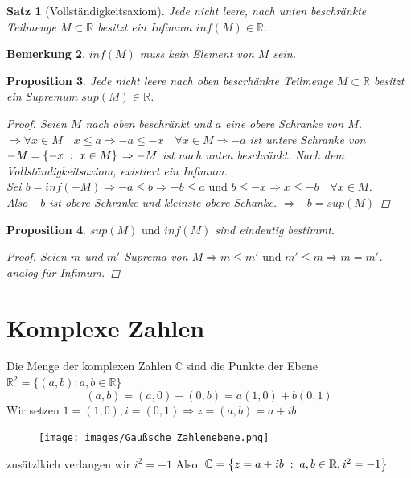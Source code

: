 \documentclass[a4paper,titlepage,oneside]{article}
\def\C{\ensuremath{\mathbb{C}} }
\def\R{\ensuremath{\mathbb{R}} }
\def\im{\ensuremath{\mathit{i}} }
\def\fa{\ensuremath{\forall}}
\def\sp{\hspace{0,1cm}}
\newcommand{\menge}[2]{\ensuremath{\left\{#1\sp : \sp #2\right\}}}
\theoremstyle{thmstyle}
\theoremstyle{subthmstyle}
\newtheorem{subsatz}{Satz}[subsection]
\newtheorem{subprop}[subsatz]{Proposition}
\newtheorem{subbem}[subsatz]{Bemerkung}
\begin{document}
\begin{subsatz}[Vollständigkeitsaxiom]
Jede nicht leere, nach unten beschränkte Teilmenge \(M \subset \R\)  besitzt ein Infimum \(inf(M) \in \R\).
\end{subsatz}

\begin{subbem}
\(inf(M)\) muss kein Element von \(M\) sein.
\end{subbem}

\begin{subprop}
Jede nicht leere nach oben bescrhänkte Teilmenge \(M \subset \R\) besitzt ein Supremum \(sup(M) \in \R\).
\begin{proof}
Seien \(M\) nach oben beschränkt und \(a\) eine obere Schranke von \(M\).\\
\(\Rightarrow \fa x \in M  \quad x \le a \Rightarrow -a \le -x \quad \fa x \in M \Rightarrow -a\) ist untere Schranke von \(-M = \menge{-x}{x \in M}\\
\Rightarrow -M\) ist nach unten beschränkt. Nach dem Vollständigkeitsaxiom, existiert ein Infimum.\\
Sei \(b= inf(-M) \Rightarrow -a \le b \Rightarrow -b \le a \text{ und } b \le -x \Rightarrow x \le -b \quad \forall x \in M\).\\
Also \(-b\) ist obere Schranke und kleinste obere Schanke. \(\Rightarrow -b = sup(M)\)
\end{proof}
\end{subprop}

\begin{subprop}
\(sup(M) \text{ und } inf(M)\) sind eindeutig bestimmt.
\begin{proof}
Seien \(m\) und \(m'\) Suprema von \(M \Rightarrow m \le m' \text{ und } m' \le m \Rightarrow m = m'\).\\
analog für Infimum.
\end{proof}
\end{subprop}


\section{Komplexe Zahlen}
Die Menge der komplexen Zahlen \C sind die Punkte der Ebene \(\R^2 = \{(a,b) : a,b \in \R\}\)
\[(a,b) = (a, 0) + (0, b) = a (1,0) + b (0, 1)\]
Wir setzen \(1 = (1,0), \im = (0,1) \Rightarrow z = (a, b) = a + \im b\)
\begin{figure}[ht]
 \texttt{[image: images/Gaußsche\_Zahlenebene.png]}
\end{figure}
zusätzlkich verlangen wir \(\im^2 = -1\) Also: \(\C = \menge{z = a + \im b }{ a, b \in \R, \im^2 = -1 }\)
\end{document}
